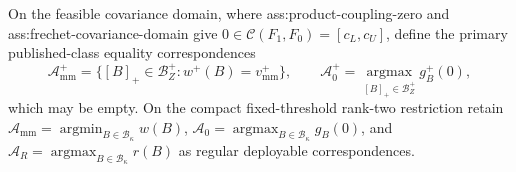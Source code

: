 On the feasible covariance domain, where ass:product-coupling-zero and ass:frechet-covariance-domain give \(0\in\mathcal C(F_1,F_0)=[c_L,c_U]\), define the primary published-class equality correspondences
\[
\mathcal A_{\mathrm{mm}}^+=\{[B]_+\in\mathcal B_Z^+:w^+(B)=v_{\mathrm{mm}}^+\},
\qquad
\mathcal A_0^+=\operatorname*{argmax}_{[B]_+\in\mathcal B_Z^+}g_B^+(0),
\]
which may be empty.  On the compact fixed-threshold rank-two restriction retain \(\mathcal A_{\mathrm{mm}}=\operatorname*{argmin}_{B\in\mathcal B_\kappa}w(B)\), \(\mathcal A_0=\operatorname*{argmax}_{B\in\mathcal B_\kappa}g_B(0)\), and \(\mathcal A_R=\operatorname*{argmax}_{B\in\mathcal B_\kappa}r(B)\) as regular deployable correspondences.